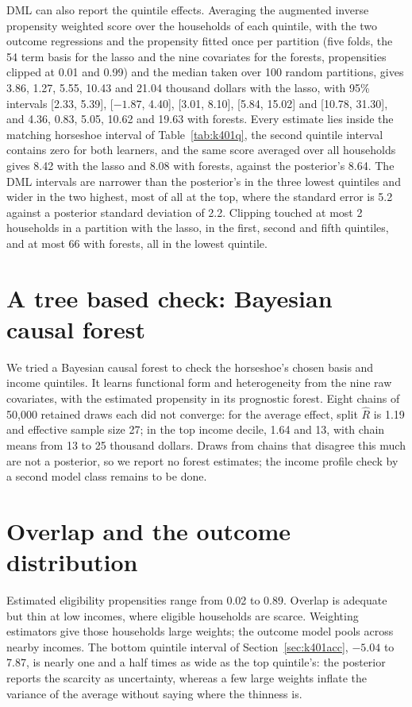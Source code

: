 DML can also report the quintile effects. Averaging the augmented inverse propensity weighted score over the households of each quintile, with the two outcome regressions and the propensity fitted once per partition (five folds, the 54 term basis for the lasso and the nine covariates for the forests, propensities clipped at 0.01 and 0.99) and the median taken over 100 random partitions, gives 3.86, 1.27, 5.55, 10.43 and 21.04 thousand dollars with the lasso, with 95\% intervals [2.33, 5.39], [$-1.87$, 4.40], [3.01, 8.10], [5.84, 15.02] and [10.78, 31.30], and 4.36, 0.83, 5.05, 10.62 and 19.63 with forests. Every estimate lies inside the matching horseshoe interval of Table~\ref{tab:k401q}, the second quintile interval contains zero for both learners, and the same score averaged over all households gives 8.42 with the lasso and 8.08 with forests, against the posterior's 8.64. The DML intervals are narrower than the posterior's in the three lowest quintiles and wider in the two highest, most of all at the top, where the standard error is 5.2 against a posterior standard deviation of 2.2. Clipping touched at most 2 households in a partition with the lasso, in the first, second and fifth quintiles, and at most 66 with forests, all in the lowest quintile.

\section{A tree based check: Bayesian causal forest}

We tried a Bayesian causal forest to check the horseshoe's chosen basis and income quintiles. It learns functional form and heterogeneity from the nine raw covariates, with the estimated propensity in its prognostic forest. Eight chains of 50,000 retained draws each did not converge: for the average effect, split $\hat R$ is 1.19 and effective sample size 27; in the top income decile, 1.64 and 13, with chain means from 13 to 25 thousand dollars. Draws from chains that disagree this much are not a posterior, so we report no forest estimates; the income profile check by a second model class remains to be done.

\section{Overlap and the outcome distribution}\label{sec:k401overlap}

Estimated eligibility propensities range from 0.02 to 0.89. Overlap is adequate but thin at low incomes, where eligible households are scarce. Weighting estimators give those households large weights; the outcome model pools across nearby incomes. The bottom quintile interval of Section~\ref{sec:k401acc}, $-5.04$ to 7.87, is nearly one and a half times as wide as the top quintile's: the posterior reports the scarcity as uncertainty, whereas a few large weights inflate the variance of the average without saying where the thinness is.

